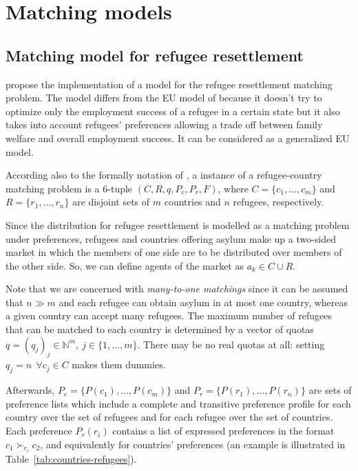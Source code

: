 \section{Matching models}\label{matching-models}%


\subsection{Matching model for refugee resettlement}\label{matching-model-for-refugee-resettlement}%

\citet{olbergml,basshuysen,delacretaz_2020,fernandez} propose the implementation of a model for the refugee resettlement matching problem.
The model differs from the EU model of \citet{basshuysen} because it doesn't try to optimize only the employment success of a refugee in a certain state but it also takes into account refugees' preferences allowing a trade off between family welfare and overall employment success.
It can be considered as a generalized EU model.

According also to the formally notation of \citet{salles}, a instance of a refugee-country matching problem is a 6-tuple \((C, R, q, P_c, P_r, F)\), where \(C = \{c_1, \dots, c_m\}\) and \(R = \{r_1, \dots, r_n\}\) are disjoint sets of \(m\) countries and \(n\) refugees, respectively.

Since the distribution for refugee resettlement is modelled as a matching problem under preferences, refugees and countries offering asylum make up a two-sided market in which the members of one side are to be distributed over members of the other side.
So, we can define agents of the market as \(a_k \in C \cup R\).

Note that we are concerned with \textit{many-to-one matchings} since it can be assumed that \(n \gg m\) and each refugee can obtain asylum in at most one country, whereas a given country can accept many refugees. The maximum number of refugees that can be matched to each country is determined by a vector of quotas \(q = (q_j)_j \in \mathbb{N}^m,\ j\in\{1,\dots ,m\}\). There may be no real quotas at all: setting \(q_j = n\ \ \forall c_j \in C\) makes them dummies.

Afterwards, \(P_c = \{P(c_1), \dots, P(c_m)\}\) and \(P_r =\{P(r_1), \dots, P(r_n)\}\) are sets of preference lists which include a complete and transitive preference profile for each country over the set of refugees and for each refugee over the set of countries.
Each preference \(P_r(r_i)\) contains a list of expressed preferences in the format \(c_1 \succ_{r_i} c_2\), and equivalently for countries' preferences (an example is illustrated in Table~\ref{tab:countries-refugees}).


